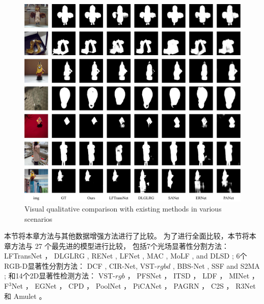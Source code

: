 \begin{figure}[!ht]
	\centering
	\includegraphics[width=\linewidth]{figures/chapter4/figures_comp}
	{Visual qualitative comparison with existing methods in various scenarios}
	\label{chpt4:fig:comparison_4}
\end{figure}



本节将本章方法与其他数据增强方法进行了比较。
为了进行全面比较，本节将本章方法与 27 个最先进的模型进行比较，
包括7个光场显著性分割方法：
LFTransNet ，
DLGLRG , RENet , LFNet ,
MAC , MoLF , and DLSD ;
%
%
%
%
6个RGB-D显著性分割方法：
DCF , CIR-Net, VST-$rgbd$  ,
BBS-Net     , SSF and S2MA    ;
%
%
%
%
%
和14个2D显著性检测方法：
VST-$rgb$ ，
PFSNet ，
ITSD ，
LDF ，
MINet ，
F$^{3}$Net  ， 
EGNet   ，
CPD  ，
PoolNet ，
PiCANet ，
PAGRN ，
C2S   ，
R3Net  
和
Amulet 。





